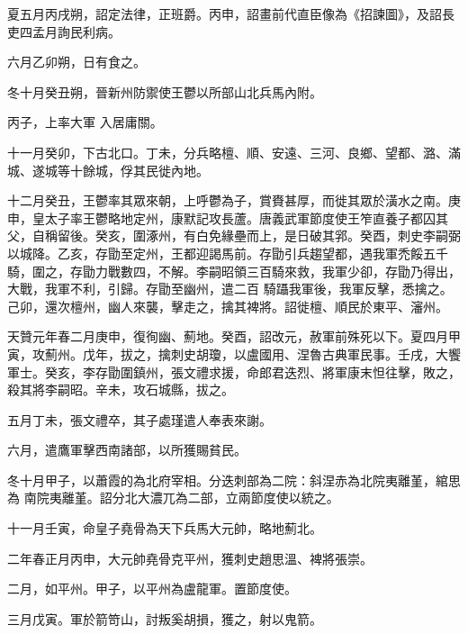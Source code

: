\begin{pinyinscope}
 夏五月丙戌朔，詔定法律，正班爵。丙申，詔畫前代直臣像為《招諫圖》，及詔長吏四孟月詢民利病。



 六月乙卯朔，日有食之。



 冬十月癸丑朔，晉新州防禦使王鬱以所部山北兵馬內附。



 丙子，上率大軍
 入居庸關。



 十一月癸卯，下古北口。丁未，分兵略檀、順、安遠、三河、良鄉、望都、潞、滿城、遂城等十餘城，俘其民徙內地。



 十二月癸丑，王鬱率其眾來朝，上呼鬱為子，賞賚甚厚，而徙其眾於潢水之南。庚申，皇太子率王鬱略地定州，康默記攻長蘆。唐義武軍節度使王笮直養子都囚其父，自稱留後。癸亥，圍涿州，有白免緣壘而上，是日破其郛。癸酉，刺史李嗣弼以城降。乙亥，存勖至定州，王都迎謁馬前。存勖引兵趨望都，遇我軍禿餒五千騎，圍之，存勖力戰數四，不解。李嗣昭領三百騎來救，我軍少卻，存勖乃得出，大戰，我軍不利，引歸。存勖至幽州，遣二百
 騎躡我軍後，我軍反擊，悉擒之。己卯，還次檀州，幽人來襲，擊走之，擒其裨將。詔徙檀、順民於東平、瀋州。



 天贊元年春二月庚申，復徇幽、薊地。癸酉，詔改元，赦軍前殊死以下。夏四月甲寅，攻薊州。戊年，拔之，擒刺史胡瓊，以盧國用、涅魯古典軍民事。壬戌，大饗軍士。癸亥，李存勖圍鎮州，張文禮求援，命郎君迭烈、將軍康末怛往擊，敗之，殺其將李嗣昭。辛未，攻石城縣，拔之。



 五月丁未，張文禮卒，其子處瑾遣人奉表來謝。



 六月，遣鷹軍擊西南諸部，以所獲賜貧民。



 冬十月甲子，以蕭霞的為北府宰相。分迭刺部為二院：斜涅赤為北院夷離堇，綰思為
 南院夷離堇。詔分北大濃兀為二部，立兩節度使以統之。



 十一月壬寅，命皇子堯骨為天下兵馬大元帥，略地薊北。



 二年春正月丙申，大元帥堯骨克平州，獲刺史趙思溫、裨將張崇。



 二月，如平州。甲子，以平州為盧龍軍。置節度使。



 三月戊寅。軍於箭笴山，討叛奚胡損，獲之，射以鬼箭。




\end{pinyinscope}
